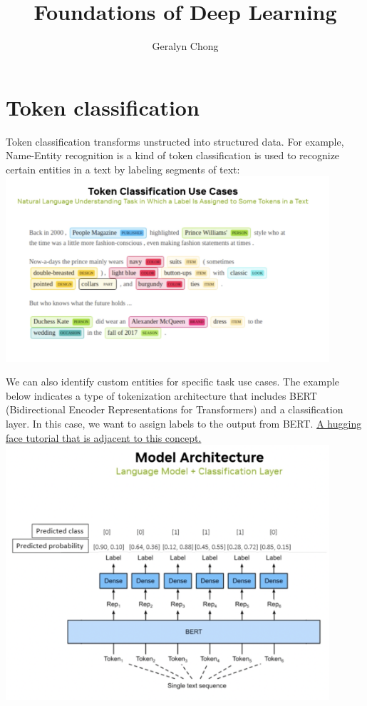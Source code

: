 \documentclass{article}
\title{Foundations of Deep Learning}
\author{Geralyn Chong}
\begin{document}
\maketitle
\tableofcontents

\section{Token classification}
Token classification transforms unstructed into structured data. For example, Name-Entity recognition is a kind of token classification is used to recognize certain entities in a text by labeling segments of text:\\ \includegraphics[width=0.9\textwidth]{../images/npr.png}

We can also identify custom entities for specific task use cases. The example below indicates a type of tokenization architecture that includes BERT (Bidirectional Encoder Representations for Transformers) and a classification layer. In this case, we want to assign labels to the output from BERT. \href{https://huggingface.co/docs/transformers/en/tasks/token_classification}{A hugging face tutorial that is adjacent to this concept. }\\\includegraphics[width=0.9\textwidth]{../images/bertToken.png}
\end{document}
